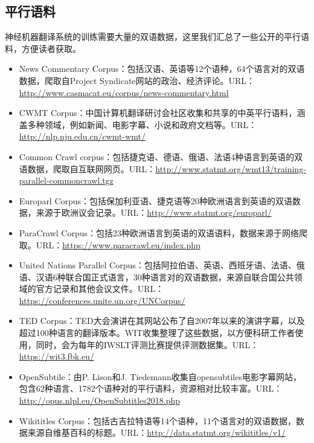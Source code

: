 \begin{appendices}
\section{平行语料}
\parinterval 神经机器翻译系统的训练需要大量的双语数据，这里我们汇总了一些公开的平行语料，方便读者获取。
\vspace{0.5em}
\begin{itemize}
\item News Commentary Corpus：包括汉语、英语等12个语种，64个语言对的双语数据，爬取自Project Syndicate网站的政治、经济评论。URL：\url{http://www.casmacat.eu/corpus/news-commentary.html}
\vspace{0.5em}
\item CWMT Corpus：中国计算机翻译研讨会社区收集和共享的中英平行语料，涵盖多种领域，例如新闻、电影字幕、小说和政府文档等。URL：\url{http://nlp.nju.edu.cn/cwmt-wmt/}
\vspace{0.5em}
\item Common Crawl corpus：包括捷克语、德语、俄语、法语4种语言到英语的双语数据，爬取自互联网网页。URL：\url{http://www.statmt.org/wmt13/training-parallel-commoncrawl.tgz}
\vspace{0.5em}
\item Europarl Corpus：包括保加利亚语、捷克语等20种欧洲语言到英语的双语数据，来源于欧洲议会记录。URL：\url{http://www.statmt.org/europarl/}
\vspace{0.5em}
\item ParaCrawl Corpus：包括23种欧洲语言到英语的双语语料，数据来源于网络爬取。URL：\url{https://www.paracrawl.eu/index.php}
\vspace{0.5em}
\item United Nations Parallel Corpus：包括阿拉伯语、英语、西班牙语、法语、俄语、汉语6种联合国正式语言，30种语言对的双语数据，来源自联合国公共领域的官方记录和其他会议文件。URL：\url{https://conferences.unite.un.org/UNCorpus/}
\vspace{0.5em}
\item TED Corpus：TED大会演讲在其网站公布了自2007年以来的演讲字幕，以及超过100种语言的翻译版本。WIT收集整理了这些数据，以方便科研工作者使用，同时，会为每年的IWSLT评测比赛提供评测数据集。URL：\url{https://wit3.fbk.eu/}
\vspace{0.5em}
\item OpenSubtile：由P. Lison和J. Tiedemann收集自opensubtiles电影字幕网站，包含62种语言、1782个语种对的平行语料，资源相对比较丰富。URL：\url{http://opus.nlpl.eu/OpenSubtitles2018.php}
\vspace{0.5em}
\item Wikititles Corpus：包括古吉拉特语等14个语种，11个语言对的双语数据，数据来源自维基百科的标题。URL：\url{http://data.statmt.org/wikititles/v1/}

\end{itemize}
\end{appendices}
